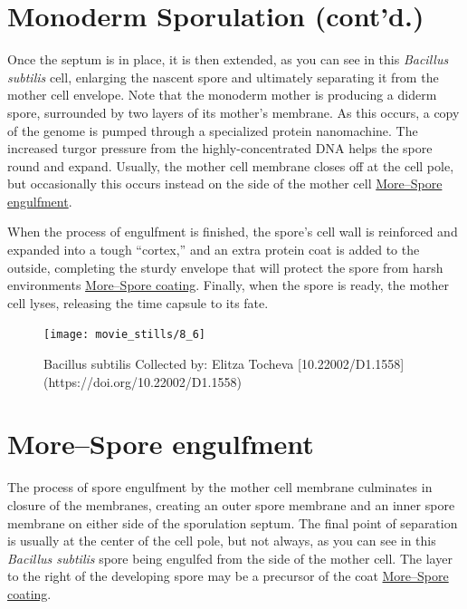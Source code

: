 \documentclass[]{tufte-book}
\begin{document}
\section{Monoderm Sporulation
(cont'd.)}\label{monoderm-sporulation-contd.}

Once the septum is in place, it is then extended, as you can see in this
\emph{Bacillus subtilis} cell, enlarging the nascent spore and
ultimately separating it from the mother cell envelope. Note that the
monoderm mother is producing a diderm spore, surrounded by two layers of
its mother's membrane. As this occurs, a copy of the genome is pumped
through a specialized protein nanomachine. The increased turgor pressure
from the highly-concentrated DNA helps the spore round and expand.
Usually, the mother cell membrane closes off at the cell pole, but
occasionally this occurs instead on the side of the mother cell
\protect\hyperlink{morespore-engulfment}{More--Spore engulfment}.

When the process of engulfment is finished, the spore's cell wall is
reinforced and expanded into a tough ``cortex,'' and an extra protein
coat is added to the outside, completing the sturdy envelope that will
protect the spore from harsh environments
\protect\hyperlink{morespore-coating}{More--Spore coating}. Finally,
when the spore is ready, the mother cell lyses, releasing the time
capsule to its fate.

\begin{figure}
\texttt{[image: movie\_stills/8\_6]} \caption[Bacillus subtilis Collected by]{Bacillus subtilis Collected by: Elitza Tocheva [10.22002/D1.1558](https://doi.org/10.22002/D1.1558)}\label{fig:unnamed-chunk-140}
\end{figure}

\hypertarget{morespore-engulfment}{\section{More--Spore
engulfment}\label{morespore-engulfment}}

The process of spore engulfment by the mother cell membrane culminates
in closure of the membranes, creating an outer spore membrane and an
inner spore membrane on either side of the sporulation septum. The final
point of separation is usually at the center of the cell pole, but not
always, as you can see in this \emph{Bacillus subtilis} spore being
engulfed from the side of the mother cell. The layer to the right of the
developing spore may be a precursor of the coat
\protect\hyperlink{morespore-coating}{More--Spore coating}.
\end{document}
